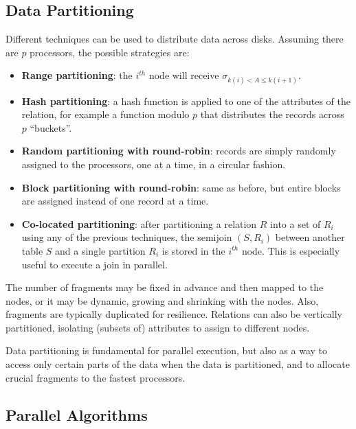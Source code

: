\subsection{Data Partitioning}

Different techniques can be used to distribute data across disks. Assuming there are $p$ processors, the possible strategies are:
\begin{itemize}
    \item \textbf{Range partitioning}: the $i^{th}$ node will receive $\sigma_{k(i) < A \leq k(i+1)}$.
    
    \item \textbf{Hash partitioning}: a hash function is applied to one of the attributes of the relation, for example a function modulo $p$ that distributes the records across $p$ ``buckets''.

    \item \textbf{Random partitioning with round-robin}: records are simply randomly assigned to the processors, one at a time, in a circular fashion.

    \item \textbf{Block partitioning with round-robin}: same as before, but entire blocks are assigned instead of one record at a time.

    \item \textbf{Co-located partitioning}: after partitioning a relation $R$ into a set of $R_i$ using any of the previous techniques, the semijoin $(S, R_i)$ between another table $S$ and a single partition $R_i$ is stored in the $i^{th}$ node. This is especially useful to execute a join in parallel.
\end{itemize}
The number of fragments may be fixed in advance and then mapped to the nodes, or it may be dynamic, growing and shrinking with the nodes. Also, fragments are typically duplicated for resilience. Relations can also be vertically partitioned, isolating (subsets of) attributes to assign to different nodes.

Data partitioning is fundamental for parallel execution, but also as a way to access only certain parts of the data when the data is partitioned, and to allocate crucial fragments to the fastest processors.

\subsection{Parallel Algorithms}

